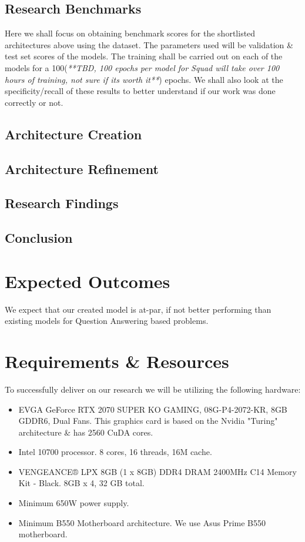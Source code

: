 \documentclass[11pt]{article}
\begin{document}
\subsection{Research Benchmarks}\label{benchmarks}
Here we shall focus on obtaining benchmark scores for the shortlisted architectures above using the dataset\cite{dataset}. The parameters used will be validation \& test set scores of the models. The training shall be carried out on each of the models for a 100(\textit{**TBD, 100 epochs per model for Squad will take over 100 hours of training, not sure if its worth it**}) epochs. We shall also look at the specificity/recall of these results to better understand if our work was done correctly or not.
\subsection{Architecture Creation}\label{architecturecreation}
\subsection{Architecture Refinement}\label{refinement}
\subsection{Research Findings}\label{findings}
\subsection{Conclusion}\label{conclusions}
\section{Expected Outcomes}\label{expectedoutcomes}

We expect that our created model is at-par, if not better performing than existing models for Question Answering based problems.
\section{Requirements \& Resources}\label{resources}

To successfully deliver on our research we will be utilizing the following hardware:
\begin{itemize}
    \item EVGA GeForce RTX 2070 SUPER KO GAMING, 08G-P4-2072-KR, 8GB GDDR6, Dual Fans\cite{2070}. This graphics card is based on the Nvidia "Turing" architecture \& has 2560 CuDA cores.
    \item Intel 10700 processor. 8 cores, 16 threads, 16M cache\cite{intel}.
    \item VENGEANCE® LPX 8GB (1 x 8GB) DDR4 DRAM 2400MHz C14 Memory Kit - Black\cite{ram}. 8GB x 4, 32 GB total.
    \item Minimum 650W power supply.
    \item Minimum B550 Motherboard architecture. We use Asus Prime B550 motherboard\cite{asus}.
\end{itemize}
\end{document}
